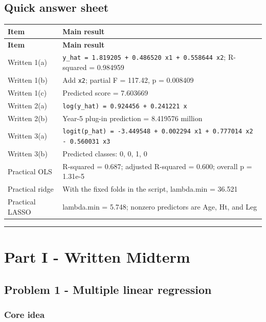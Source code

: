 ﻿\documentclass[11pt]{article}
\begin{document}
\subsection{Quick answer sheet}

\begin{center}
\begin{longtable}{>{\raggedright\arraybackslash}p{}>{\raggedright\arraybackslash}p{}}
\toprule
\rowcolor{navy!10} \textbf{Item} & \textbf{Main result} \\
\midrule
\endfirsthead
\toprule
\rowcolor{navy!10} \textbf{Item} & \textbf{Main result} \\
\midrule
\endhead
Written 1(a) & \texttt{y\_hat = 1.819205 + 0.486520 x1 + 0.558644 x2}; R-squared = 0.984959 \\
Written 1(b) & Add \texttt{x2}; partial F = 117.42, p = 0.008409 \\
Written 1(c) & Predicted score = 7.603669 \\
Written 2(a) & \texttt{log(y\_hat) = 0.924456 + 0.241221 x} \\
Written 2(b) & Year-5 plug-in prediction = 8.419576 million \\
Written 3(a) & \texttt{logit(p\_hat) = -3.449548 + 0.002294 x1 + 0.777014 x2 - 0.560031 x3} \\
Written 3(b) & Predicted classes: 0, 0, 1, 0 \\
Practical OLS & R-squared = 0.687; adjusted R-squared = 0.600; overall p = 1.31e-5 \\
Practical ridge & With the fixed folds in the script, lambda.min = 36.521 \\
Practical LASSO & lambda.min = 5.748; nonzero predictors are Age, Ht, and Leg \\
\bottomrule
\end{longtable}
\end{center}

\medskip\hrule\medskip

\section{Part I - Written Midterm}

\subsection{Problem 1 - Multiple linear regression}

\subsubsection{Core idea}
\end{document}
